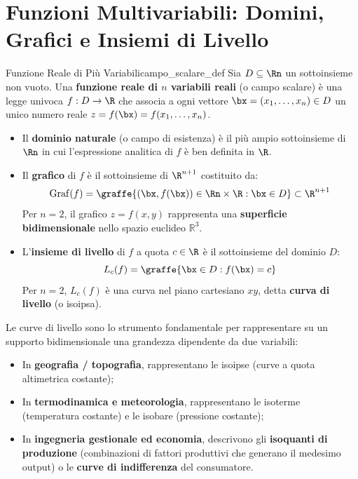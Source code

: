 \section{Funzioni Multivariabili: Domini, Grafici e Insiemi di Livello}

\begin{definizione}{Funzione Reale di Più Variabili}{campo_scalare_def}
Sia $D \subseteq \Rn$ un sottoinsieme non vuoto. Una \textbf{funzione reale di $n$ variabili reali} (o campo scalare) è una legge univoca $f: D \to \R$ che associa a ogni vettore $\bx = (x_1, \dots, x_n) \in D$ un unico numero reale $z = f(\bx) = f(x_1, \dots, x_n)$.
\begin{itemize}
    \item Il \textbf{dominio naturale} (o campo di esistenza) è il più ampio sottoinsieme di $\Rn$ in cui l'espressione analitica di $f$ è ben definita in $\R$.
    \item Il \textbf{grafico} di $f$ è il sottoinsieme di $\R^{n+1}$ costituito da:
    \[
    \operatorname{Graf}(f) = \graffe{(\bx, f(\bx)) \in \Rn \times \R : \bx \in D} \subset \R^{n+1}
    \]
    Per $n = 2$, il grafico $z = f(x,y)$ rappresenta una \textbf{superficie bidimensionale} nello spazio euclideo $\mathbb{R}^3$.
    \item L'\textbf{insieme di livello} di $f$ a quota $c \in \R$ è il sottoinsieme del dominio $D$:
    \[
    L_c(f) = \graffe{\bx \in D : f(\bx) = c}
    \]
    Per $n = 2$, $L_c(f)$ è una curva nel piano cartesiano $xy$, detta \textbf{curva di livello} (o isoipsa).
\end{itemize}
\end{definizione}

\begin{osservazione}
Le curve di livello sono lo strumento fondamentale per rappresentare su un supporto bidimensionale una grandezza dipendente da due variabili:
\begin{itemize}
    \item In \textbf{geografia / topografia}, rappresentano le isoipse (curve a quota altimetrica costante);
    \item In \textbf{termodinamica e meteorologia}, rappresentano le isoterme (temperatura costante) e le isobare (pressione costante);
    \item In \textbf{ingegneria gestionale ed economia}, descrivono gli \textbf{isoquanti di produzione} (combinazioni di fattori produttivi che generano il medesimo output) o le \textbf{curve di indifferenza} del consumatore.
\end{itemize}
\end{osservazione}

